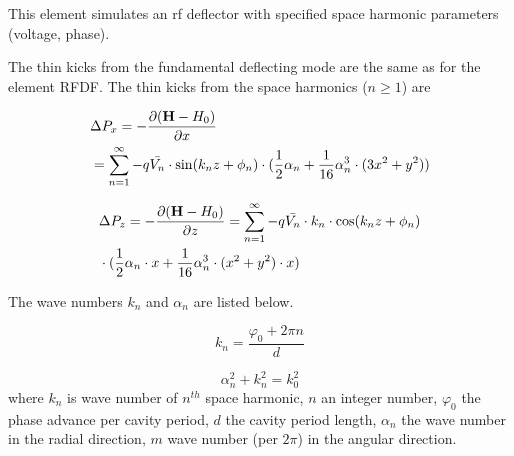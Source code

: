 This element simulates an rf deflector with specified space harmonic parameters (voltage, phase).

The thin kicks from the fundamental deflecting mode are the same as for the element RFDF. The thin kicks from the space harmonics ($n\ge 1$) are \cite{Sun-NAPAC19}

\begin{equation}
\begin{split}
& \Delta P_x  = -\frac{\partial ({\bf H} - H_0)}{\partial x} \\
 &= \sum_{n=1}^{\infty} -q \bar{ V_n} \cdot \sin (k_n z + \phi_n) \cdot (\frac{1}{2}\alpha_n + \frac{1}{16}\alpha_n^3 \cdot (3x^2 + y^2))
\end{split}
\end{equation}


\begin{equation}
\begin{split}
& \Delta P_z = -\frac{\partial ({\bf H} - H_0)}{\partial z} = \sum_{n=1}^{\infty} -q \bar{ V_n} \cdot k_n \cdot \cos (k_n z + \phi_n) \\
&\cdot (\frac{1}{2}\alpha_n \cdot x + \frac{1}{16}\alpha_n^3 \cdot (x^2 + y^2)\cdot x)
\end{split}
\end{equation} 

The wave numbers $k_n$ and $\alpha_n$ are listed below.

\begin{equation}\label{Equa1}
k_n = \frac{\varphi_0 + 2\pi n}{d}
\end{equation} 

\begin{equation}\label{Equa1}
\alpha_n^2 + k_n^2 = k_0^2
\end{equation} 
where $k_n$ is wave number of $n^{th}$ space harmonic, $n$ an integer number, $\varphi_0$ the phase advance per cavity period, $d$ the cavity period length, $\alpha_n$ the wave number in the radial direction, $m$ wave number (per $2\pi$) in the angular direction. 


